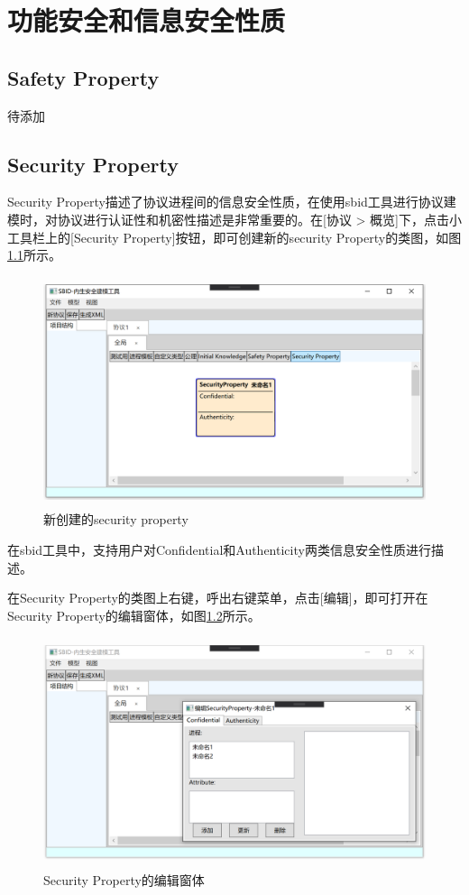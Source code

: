 \chapter{功能安全和信息安全性质}

\section{Safety Property}
待添加

\section{Security Property}
Security Property描述了协议进程间的信息安全性质，在使用sbid工具进行协议建模时，对协议进行认证性和机密性描述是非常重要的。在[协议 > 概览]下，点击小工具栏上的[Security Property]按钮，即可创建新的security Property的类图，如图\ref{create_security}所示。
\begin{figure}[h]
	\centering
	\includegraphics[width=12cm,height=6.75cm]{imgs/create_security.png}
	\caption{新创建的security property}
	\label{create_security}
\end{figure}
\par
在sbid工具中，支持用户对Confidential和Authenticity两类信息安全性质进行描述。
\par
在Security Property的类图上右键，呼出右键菜单，点击[编辑]，即可打开在Security Property的编辑窗体，如图\ref{security_edit_window}所示。
\begin{figure}[h]
	\centering
	\includegraphics[width=12cm,height=6.75cm]{imgs/security_edit_window.png}
	\caption{Security Property的编辑窗体}
	\label{security_edit_window}
\end{figure}
\par
